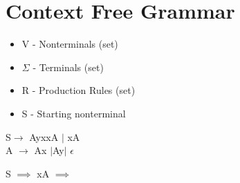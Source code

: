 \documentclass[12pt]{article}
\begin{document}
	\section*{Context Free Grammar}
	\begin{itemize}
		\item V - Nonterminals (set)
		\item $\Sigma$ - Terminals (set)
		\item R - Production Rules (set)
		\item S - Starting nonterminal
	\end{itemize}
	
	S$\rightarrow$ AyxxA $|$ xA\\
	A $\rightarrow$ Ax $|$Ay$|$ $\epsilon$
	
	S $\implies$ xA $\implies$ \\
\end{document}
